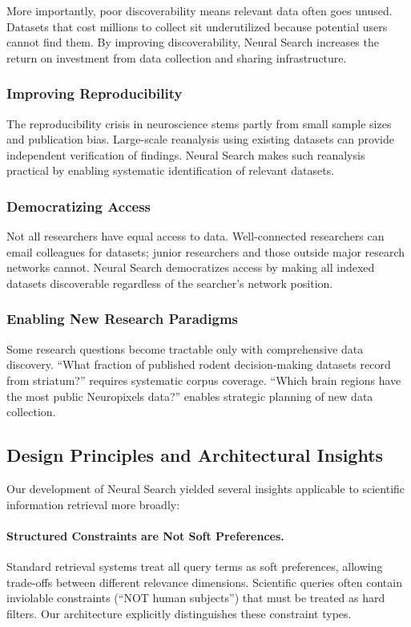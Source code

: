 \documentclass{article}
\theoremstyle{definition}
\begin{document}
More importantly, poor discoverability means relevant data often goes unused. Datasets that cost millions to collect sit underutilized because potential users cannot find them. By improving discoverability, Neural Search increases the return on investment from data collection and sharing infrastructure.

\subsubsection{Improving Reproducibility}

The reproducibility crisis in neuroscience \citep{button2013power} stems partly from small sample sizes and publication bias. Large-scale reanalysis using existing datasets can provide independent verification of findings. Neural Search makes such reanalysis practical by enabling systematic identification of relevant datasets.

\subsubsection{Democratizing Access}

Not all researchers have equal access to data. Well-connected researchers can email colleagues for datasets; junior researchers and those outside major research networks cannot. Neural Search democratizes access by making all indexed datasets discoverable regardless of the searcher's network position.

\subsubsection{Enabling New Research Paradigms}

Some research questions become tractable only with comprehensive data discovery. ``What fraction of published rodent decision-making datasets record from striatum?'' requires systematic corpus coverage. ``Which brain regions have the most public Neuropixels data?'' enables strategic planning of new data collection.

\subsection{Design Principles and Architectural Insights}

Our development of Neural Search yielded several insights applicable to scientific information retrieval more broadly:

\paragraph{Structured Constraints are Not Soft Preferences.} Standard retrieval systems treat all query terms as soft preferences, allowing trade-offs between different relevance dimensions. Scientific queries often contain inviolable constraints (``NOT human subjects'') that must be treated as hard filters. Our architecture explicitly distinguishes these constraint types.
\end{document}
